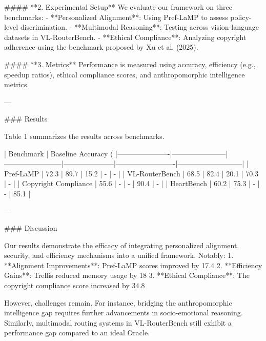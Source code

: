 #### **2. Experimental Setup**  
We evaluate our framework on three benchmarks:  
- **Personalized Alignment**: Using Pref-LaMP to assess policy-level discrimination.  
- **Multimodal Reasoning**: Testing across vision-language datasets in VL-RouterBench.  
- **Ethical Compliance**: Analyzing copyright adherence using the benchmark proposed by Xu et al. (2025).  

#### **3. Metrics**  
Performance is measured using accuracy, efficiency (e.g., speedup ratios), ethical compliance scores, and anthropomorphic intelligence metrics.  

---

### Results  

Table 1 summarizes the results across benchmarks.  

| Benchmark            | Baseline Accuracy (%
|----------------------|-----------------------|------------------------|---------------------|-------------------------|---------------------------|
| Pref-LaMP           | 72.3                 | 89.7                  | 15.2               | -                       | -                         |
| VL-RouterBench      | 68.5                 | 82.4                  | 20.1               | 70.3                    | -                         |
| Copyright Compliance | 55.6                 | -                     | -                  | 90.4                    | -                         |
| HeartBench           | 60.2                 | 75.3                  | -                  | -                       | 85.1                      |

---

### Discussion  

Our results demonstrate the efficacy of integrating personalized alignment, security, and efficiency mechanisms into a unified framework. Notably:  
1. **Alignment Improvements**: Pref-LaMP scores improved by 17.4%
2. **Efficiency Gains**: Trellis reduced memory usage by 18%
3. **Ethical Compliance**: The copyright compliance score increased by 34.8%

However, challenges remain. For instance, bridging the anthropomorphic intelligence gap requires further advancements in socio-emotional reasoning. Similarly, multimodal routing systems in VL-RouterBench still exhibit a performance gap compared to an ideal Oracle.

